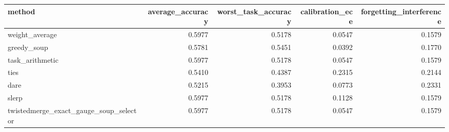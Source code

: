 \begin{tabular}{lrrrr}
\toprule
method & average_accuracy & worst_task_accuracy & calibration_ece & forgetting_interference \\
\midrule
weight_average & 0.5977 & 0.5178 & 0.0547 & 0.1579 \\
greedy_soup & 0.5781 & 0.5451 & 0.0392 & 0.1770 \\
task_arithmetic & 0.5977 & 0.5178 & 0.0547 & 0.1579 \\
ties & 0.5410 & 0.4387 & 0.2315 & 0.2144 \\
dare & 0.5215 & 0.3953 & 0.0773 & 0.2331 \\
slerp & 0.5977 & 0.5178 & 0.1128 & 0.1579 \\
twistedmerge_exact_gauge_soup_selector & 0.5977 & 0.5178 & 0.0547 & 0.1579 \\
\bottomrule
\end{tabular}

